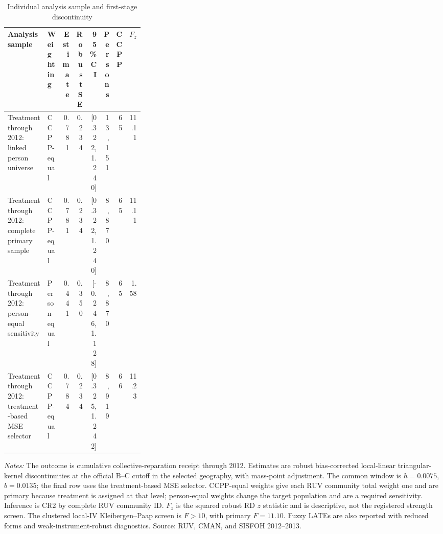 \begin{table}[!htbp]
\centering
\scriptsize
\caption{Individual analysis sample and first-stage discontinuity}
\label{tab:rd_outcomes_first_stage_2013_individual}
\begin{tabular}{p{0.31\linewidth}lrrrrrr}
\toprule
Analysis sample & Weighting & Estimate & Robust SE & 95\% CI & Persons & CCPP & \(F_z\) \\
\midrule
Treatment through 2012: linked person universe & CCPP-equal & 0.781 & 0.234 & [0.322, 1.240] & 13,151 & 65 & 11.11 \\
Treatment through 2012: complete primary sample & CCPP-equal & 0.781 & 0.234 & [0.322, 1.240] & 8,870 & 65 & 11.11 \\
Treatment through 2012: person-equal sensitivity & Person-equal & 0.441 & 0.350 & [-0.246, 1.128] & 8,870 & 65 & 1.58 \\
Treatment through 2012: treatment-based MSE selector & CCPP-equal & 0.784 & 0.234 & [0.325, 1.242] & 8,919 & 66 & 11.23 \\
\bottomrule
\end{tabular}
\parbox{0.97\linewidth}{\footnotesize \textit{Notes:} The outcome is cumulative collective-reparation receipt through 2012. Estimates are robust bias-corrected local-linear triangular-kernel discontinuities at the official B--C cutoff in the selected geography, with mass-point adjustment. The common window is \(h=0.0075\), \(b=0.0135\); the final row uses the treatment-based MSE selector. CCPP-equal weights give each RUV community total weight one and are primary because treatment is assigned at that level; person-equal weights change the target population and are a required sensitivity. Inference is CR2 by complete RUV community ID. \(F_z\) is the squared robust RD \(z\) statistic and is descriptive, not the registered strength screen. The clustered local-IV Kleibergen--Paap screen is \(F>10\), with primary \(F=11.10\). Fuzzy LATEs are also reported with reduced forms and weak-instrument-robust diagnostics. Source: RUV, CMAN, and SISFOH 2012--2013.}
\end{table}
